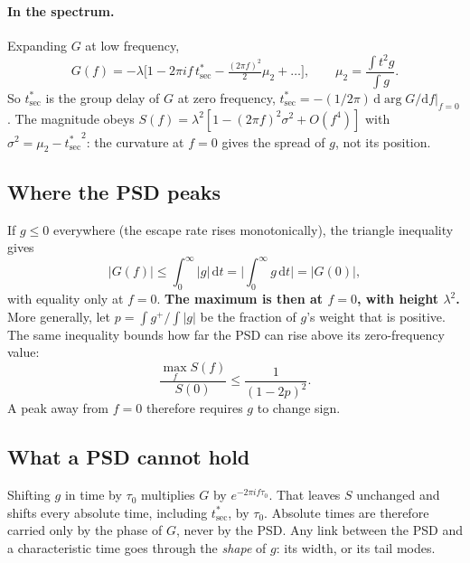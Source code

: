 \documentclass[11pt]{article}
\newcommand{\tsec}{t^*_{\mathrm{sec}}}
\newcommand{\dd}{\mathrm{d}}
\begin{document}
\paragraph{In the spectrum.} Expanding $G$ at low frequency,
\[
  G(f)=-\lambda\Big[1-2\pi i f\,\tsec-\tfrac{(2\pi f)^2}{2}\mu_2+\dots\Big],
  \qquad \mu_2=\frac{\int t^2g}{\int g}.
\]
So $\tsec$ is the group delay of $G$ at zero frequency,
$\tsec=-(1/2\pi)\,\dd\arg G/\dd f|_{f=0}$. The magnitude obeys
$S(f)=\lambda^2[1-(2\pi f)^2\sigma^2+O(f^4)]$ with $\sigma^2=\mu_2-{\tsec}^2$:
the curvature at $f=0$ gives the spread of $g$, not its position.

\subsection{Where the PSD peaks}
If $g\le0$ everywhere (the escape rate rises monotonically), the triangle
inequality gives
\[
  |G(f)|\le\int_0^\infty|g|\,\dd t=\Big|\int_0^\infty g\,\dd t\Big|=|G(0)|,
\]
with equality only at $f=0$. \textbf{The maximum is then at $f=0$, with height
$\lambda^2$.} More generally, let $p=\int g^+/\int|g|$ be the fraction of $g$'s
weight that is positive. The same inequality bounds how far the PSD can rise
above its zero-frequency value:
\begin{equation}
  \frac{\max_f S(f)}{S(0)}\le\frac{1}{(1-2p)^2}.
  \label{eq:bound}
\end{equation}
A peak away from $f=0$ therefore requires $g$ to change sign.

\subsection{What a PSD cannot hold}
Shifting $g$ in time by $\tau_0$ multiplies $G$ by $e^{-2\pi i f\tau_0}$. That
leaves $S$ unchanged and shifts every absolute time, including $\tsec$, by
$\tau_0$. Absolute times are therefore carried only by the phase of $G$, never by
the PSD. Any link between the PSD and a characteristic time goes through the
\emph{shape} of $g$: its width, or its tail modes.
\end{document}
